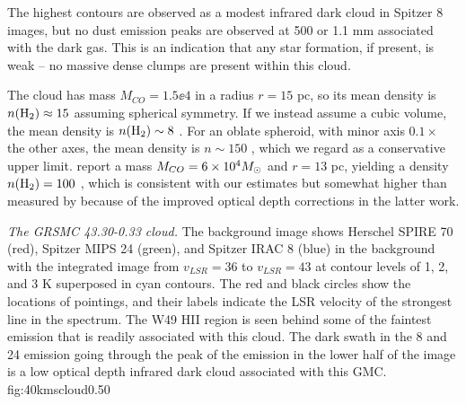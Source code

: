 The highest \thirteenco contours are observed as a modest infrared dark cloud
in Spitzer 8 \um images, but no dust emission peaks are observed at 500 \um or
1.1 mm associated with the dark gas.  This is an indication that any star
formation, if present, is weak -- no massive dense clumps are present within
this cloud.

%
%
% 
% 
% 
The cloud has mass $M_{CO} = 1.5\ee{4}$ \msun in a radius $r=15$ pc, so its
mean density is $n(\textrm{H}_{2}) \approx 15$ \percc assuming spherical symmetry.  If we
instead assume a cubic volume, the mean density is $n(\textrm{H}_{2})\sim8$ \percc.  For
an oblate spheroid, with minor axis $0.1\times$ the other axes, the mean
density is $n\sim150$ \percc, which we regard as a conservative upper limit.
\citet{Simon2001a} report a mass $M_{CO} = 6\times10^{4} M_{\odot}$ and $r=13$ pc,
yielding a density $n(\textrm{H}_{2})=100$ \percc, which is consistent with our estimates
but somewhat higher than measured by \citet{Roman-Duval2010a} because of the
improved optical depth corrections in the latter work.


{\textit{The GRSMC 43.30-0.33 cloud.}  The background image shows Herschel SPIRE 70 \um (red),
Spitzer MIPS 24 \um (green), and Spitzer IRAC 8 \um (blue) in the background with
the \thirteenco integrated image from $v_{LSR}=36$ \kms to $v_{LSR}=43$ \kms at contour levels of
1, 2, and 3 K \kms superposed in cyan contours.  The red and black circles
show the locations of \formaldehyde pointings, and their labels indicate the LSR velocity
of the strongest line in the spectrum.  The W49 HII region is seen
behind some of the faintest \thirteenco emission that is readily associated
with this cloud.  The dark swath in the 8 and 24 \um emission going through the
peak of the \thirteenco emission in the lower half of the image is a low
optical depth infrared dark cloud associated with this GMC.}
{fig:40kmscloud}{0.5}{0}

